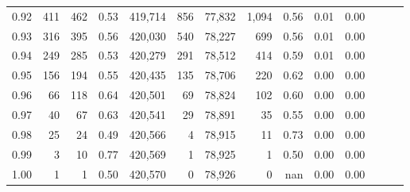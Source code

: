 \begin{tabular}{rrrrrrrrrrrrrr}
0.92 &    411 &    462 &  0.53 &  419,714 &      856 &  77,832 &   1,094 &  0.56 &  0.01 &      0.00 \\
0.93 &    316 &    395 &  0.56 &  420,030 &      540 &  78,227 &     699 &  0.56 &  0.01 &      0.00 \\
0.94 &    249 &    285 &  0.53 &  420,279 &      291 &  78,512 &     414 &  0.59 &  0.01 &      0.00 \\
0.95 &    156 &    194 &  0.55 &  420,435 &      135 &  78,706 &     220 &  0.62 &  0.00 &      0.00 \\
0.96 &     66 &    118 &  0.64 &  420,501 &       69 &  78,824 &     102 &  0.60 &  0.00 &      0.00 \\
0.97 &     40 &     67 &  0.63 &  420,541 &       29 &  78,891 &      35 &  0.55 &  0.00 &      0.00 \\
0.98 &     25 &     24 &  0.49 &  420,566 &        4 &  78,915 &      11 &  0.73 &  0.00 &      0.00 \\
0.99 &      3 &     10 &  0.77 &  420,569 &        1 &  78,925 &       1 &  0.50 &  0.00 &      0.00 \\
1.00 &      1 &      1 &  0.50 &  420,570 &        0 &  78,926 &       0 &   nan &  0.00 &      0.00 \\
\bottomrule
\end{tabular}
